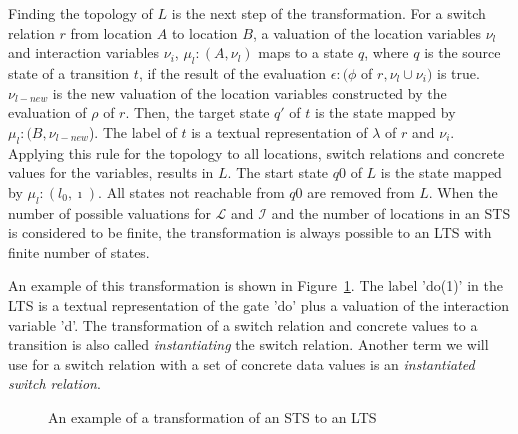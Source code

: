 Finding the topology of $L$ is the next step of the transformation. For a switch relation $r$ from location $A$ to location $B$, a valuation of the location variables $\nu_l$ and interaction variables $\nu_i$, $\mu_l:(A,\nu_l)$ maps to a state $q$, where $q$ is the source state of a transition $t$, if the result of the evaluation $\epsilon:(\phi$ of $r, \nu_l \cup \nu_i)$ is true. $\nu_{l-new}$ is the new valuation of the location variables constructed by the evaluation of $\rho$ of $r$. Then, the target state $q'$ of $t$ is the state mapped by $\mu_l:(B,\nu_{l-new}$). The label of $t$ is a textual representation of $\lambda$ of $r$ and $\nu_i$. Applying this rule for the topology to all locations, switch relations and concrete values for the variables, results in $L$. The start state $q0$ of $L$ is the state mapped by $\mu_l:(l_0,\imath)$. All states not reachable from $q0$ are removed from $L$. When the number of possible valuations for $\mathcal{L}$ and $\mathcal{I}$ and the number of locations in an STS is considered to be finite, the transformation is always possible to an LTS with finite number of states.

An example of this transformation is shown in Figure~\ref{fig:example_trafo}. The label 'do(1)' in the LTS is a textual representation of the gate 'do' plus a valuation of the interaction variable 'd'. The transformation of a switch relation and concrete values to a transition is also called \textit{instantiating} the switch relation. Another term we will use for a switch relation with a set of concrete data values is an \textit{instantiated switch relation}.

\begin{figure}[ht]
  \begin{center}
    \hspace{20px}
  \end{center}
  \caption{An example of a transformation of an STS to an LTS}
  \label{fig:example_trafo}
\end{figure}

